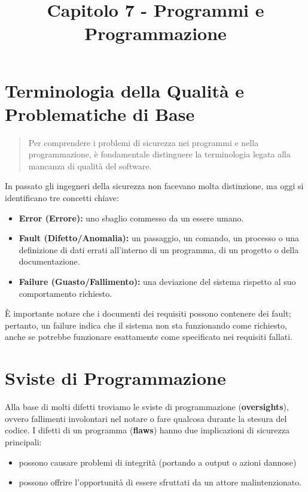 \documentclass{article}
\title{Capitolo 7 - Programmi e Programmazione}
\author{}
\date{}
\begin{document}
\maketitle

\section*{Terminologia della Qualità e Problematiche di Base}

\begin{quote}
    Per comprendere i problemi di sicurezza nei programmi e nella programmazione, è fondamentale distinguere la terminologia legata alla mancanza di qualità del software.
\end{quote}

\noindent In passato gli ingegneri della sicurezza non facevano molta distinzione, ma oggi si identificano tre concetti chiave:

\begin{itemize}
    \item \textbf{Error (Errore):} uno sbaglio commesso da un essere umano.
    \item \textbf{Fault (Difetto/Anomalia):} un passaggio, un comando, un processo o una definizione di dati errati all'interno di un programma, di un progetto o della documentazione.
    \item \textbf{Failure (Guasto/Fallimento):} una deviazione del sistema rispetto al suo comportamento richiesto.
\end{itemize}

\vspace{0.3cm}
\noindent È importante notare che i documenti dei requisiti possono contenere dei fault; pertanto, un failure indica che il sistema non sta funzionando come richiesto, anche se potrebbe funzionare esattamente come specificato nei requisiti fallati.

\vspace{0.8cm}

\section*{Sviste di Programmazione}

Alla base di molti difetti troviamo le sviste di programmazione (\textbf{oversights}), ovvero fallimenti involontari nel notare o fare qualcosa durante la stesura del codice. 
I difetti di un programma (\textbf{flaws}) hanno due implicazioni di sicurezza principali:

\begin{itemize}
    \item possono causare problemi di integrità (portando a output o azioni dannose)
    \item possono offrire l'opportunità di essere sfruttati da un attore malintenzionato.
\end{itemize}
\end{document}
